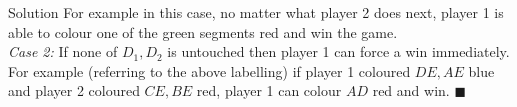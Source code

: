 \documentclass{article}
\begin{document}
\begin{solution}{Solution}
For example in this case, no matter what player 2 does next, player 1
is able to colour one of the green segments red and win the game. \\

\textit{Case 2:} If none of $D_1, D_2$ is untouched then player 1 can force
a win immediately. For example (referring to the above labelling)
if player 1 coloured $DE, AE$ blue and player 2 coloured $CE, BE$ red,
player 1 can colour $AD$ red and win. $\blacksquare$

\end{solution}
\end{document}
